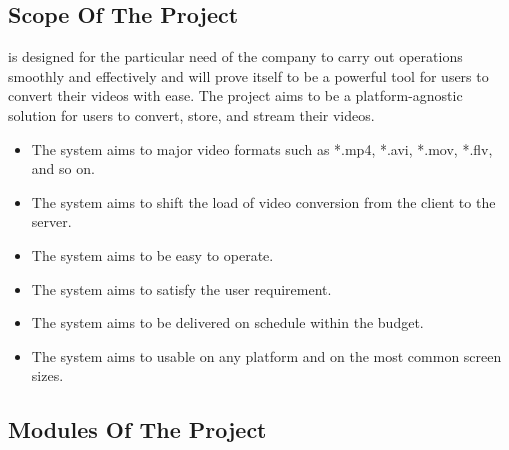 	\subsection{Scope Of The Project}
	\vs
	\projectname\space is designed for the particular need of the company to carry out operations smoothly and effectively and will prove itself to be a powerful tool for users to convert their videos with ease. The project aims to be a platform-agnostic solution for users to convert, store, and stream their videos.
	\vs
	\begin{itemize}
		\item The system aims to major video formats such as *.mp4, *.avi, *.mov, *.flv, and so on.
		\item The system aims to shift the load of video conversion from the client to the server.
		\item The system aims to be easy to operate.
		\item The system aims to satisfy the user requirement. 
		\item The system aims to be delivered on schedule within the budget.
		\item The system aims to usable on any platform and on the most common screen sizes.
	\end{itemize}
	\pagebreak
	\subsection{Modules Of The Project}
